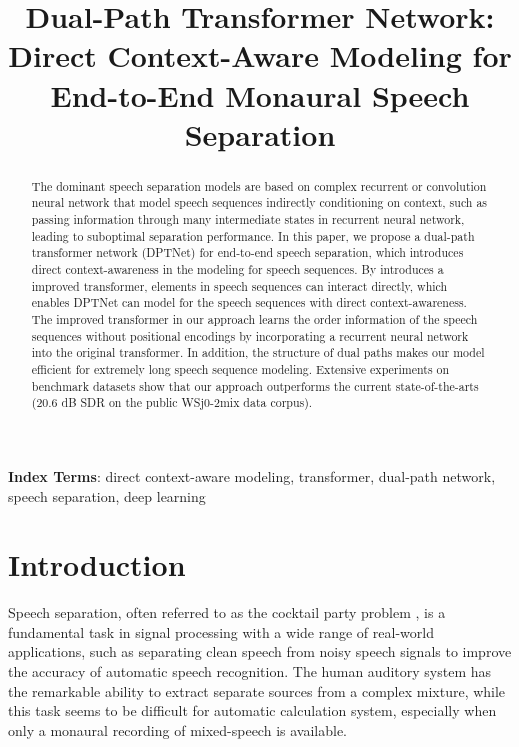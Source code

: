 \documentclass[a4paper]{article}
\title{Dual-Path Transformer Network: Direct Context-Aware Modeling for End-to-End Monaural Speech Separation}
\begin{document}
\maketitle
\begin{abstract}
  The dominant speech separation models are based on complex recurrent or convolution neural network that model speech sequences indirectly conditioning on context, such as passing information through many intermediate states in recurrent neural network, leading to suboptimal separation performance. In this paper, we propose a dual-path transformer network (DPTNet) for end-to-end speech separation, which introduces direct context-awareness in the modeling for speech sequences. By introduces a improved transformer, elements in speech sequences can interact directly, which enables DPTNet can model for the speech sequences with direct context-awareness. The improved transformer in our approach learns the order information of the speech sequences without positional encodings by incorporating a recurrent neural network into the original transformer. In addition, the structure of dual paths makes our model efficient for extremely long speech sequence modeling. Extensive experiments on benchmark datasets show that our approach outperforms the current state-of-the-arts (20.6 dB SDR on the public WSj0-2mix data corpus). \end{abstract}
\noindent\textbf{Index Terms}: direct context-aware modeling, transformer, dual-path network, speech separation, deep learning

\section{Introduction}

Speech separation, often referred to as the cocktail party problem \cite{bronkhorst2000cocktail,haykin2005the}, is a fundamental task in signal processing with a wide range of real-world applications, such as separating clean speech from noisy speech signals to improve the accuracy of automatic speech recognition. The human auditory system has the remarkable ability to extract separate sources from a complex mixture, while this task seems to be difficult for automatic calculation system, especially when only a monaural recording of mixed-speech is available.
\end{document}
